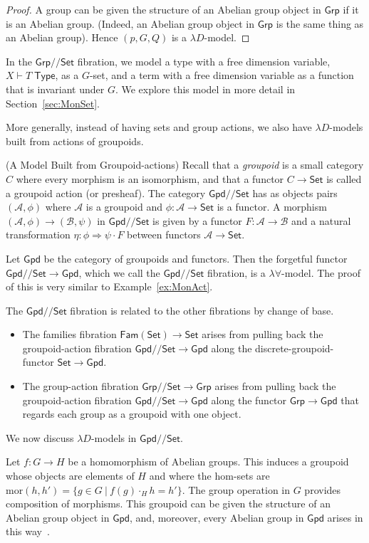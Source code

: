 \documentclass[a4paper,UKenglish]{lipics}
\newcommand{\msf}[1]{\mathsf{#1}} %
\newcommand{\Grp}{\msf{Grp}}
\newcommand{\Set}{\msf{Set}}
\newcommand{\Gpd}{\msf{Gpd}}
\newcommand{\Fam}[1]{\msf{Fam}(#1)}
\newcommand{\A}{\mathcal{A}}
\newcommand{\B}{\mathcal{B}}
\newcommand{\Lslice}[1]{#1/\!/\Set}
\newcommand{\GrpSet}{\Lslice{\Grp}}
\newcommand{\GpdSet}{\Lslice{\Gpd}}
\newcommand{\Tj}[2]{#1 \vdash #2 \; \msf{ Type}}
\newcommand{\Dvar}{X}
\begin{document}
\begin{example}
\begin{proof}
A group can be given the structure of an Abelian group object in $\Grp$ if it is an Abelian group. (Indeed, an Abelian group object in $\Grp$ is the same thing as an Abelian group). Hence $(p,G,Q)$ is a $\lambda D$-model.
\end{proof}

In the $\GrpSet$ fibration, we model a type with a free dimension variable, $\Tj\Dvar T$, as a $G$-set, and a term with a free dimension variable as a function that is invariant under $G$. We explore this model in more detail in Section~\ref{sec:MonSet}.
\end{example}

More generally, instead of having sets and group actions, we also have $\lambda D$-models built from actions of groupoids.

\begin{example}(A Model Built from Groupoid-actions)
\label{ex:presheaves}
Recall that a \emph{groupoid} is a small category $C$ where every morphism is an isomorphism, and that a functor $C\to\Set$ is called a groupoid action (or presheaf). The category $\GpdSet$ has as objects pairs $(\A,\phi)$ where $\A$ is a groupoid and $\phi:\A\to\Set$ is a functor. A morphism $(\A,\phi) \rightarrow (\B,\psi)$ in $\GpdSet$ is given by a functor $F:\A\rightarrow \B$ and a natural transformation $\eta:\phi \Rightarrow \psi \cdot F$ between functors $\A \to\Set$.

Let $\Gpd$ be the category of groupoids and functors. Then the forgetful functor $\GpdSet\to \Gpd$, which we call the $\GpdSet$ fibration, is a $\lambda \forall$-model.
The proof of this is very similar to Example~\ref{ex:MonAct}.

The $\GpdSet$ fibration is related to the other fibrations by change of base.
\begin{itemize}
\item
The families fibration $\Fam\Set\to\Set$ arises from pulling back the groupoid-action fibration
$\GpdSet\to\Gpd$ along the discrete-groupoid-functor $\Set\to\Gpd$.
\item The group-action fibration $\GrpSet\to\Grp$ arises from pulling
  back the groupoid-action fibration $\GpdSet\to\Gpd$ along the functor
  $\Grp\to\Gpd$ that regards each group as a groupoid with one
  object.
\end{itemize}

We now discuss $\lambda D$-models in $\GpdSet$.

Let $f:G\to H$ be a homomorphism of Abelian groups. This induces a groupoid
whose objects are elements of $H$ and where the hom-sets are $\mathrm{mor}(h,h')=\{g\in G~|~f(g)\cdot_Hh=h'\}$. The group operation in $G$ provides
composition of morphisms.
This groupoid can be given the structure of an Abelian group object in
$\Gpd$, and, moreover, every Abelian group in $\Gpd$ arises in this way~\cite{brown-spencer}.


\end{example}
\end{document}
